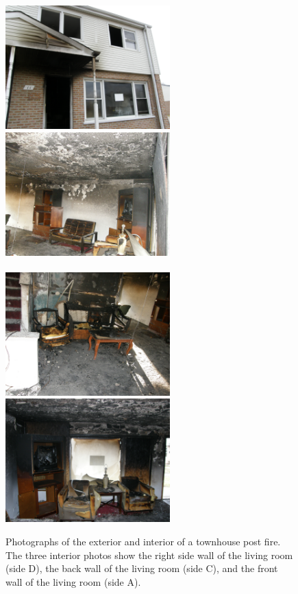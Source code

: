 \documentclass[twoside]{uocthesis}
\begin{document}
{\begin{figure}[ht!]
	\centering
		\includegraphics[width=2.5in]{../Figures/EXT_SideA}
		\includegraphics[width=2.5in]{../Figures/INT_SideD}\\
		\hspace{3 mm}  \\
		\includegraphics[width=2.5in]{../Figures/INT_SideC}
		\includegraphics[width=2.5in]{../Figures/INT_SideA}\\
	\caption[Photographs of the exterior and interior of a townhouse post fire]{Photographs of the exterior and interior of a townhouse post fire. The three interior photos show the right side wall of the living room (side D), the back wall of the living room (side C), and the front wall of the living room (side A).}
	\label{EXT_INTLR}
\end{figure}

}
\end{document}
